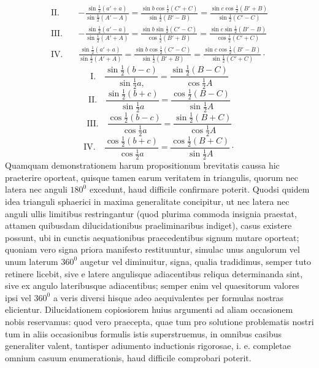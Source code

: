 {\[\begin{aligned}
\mathrm{II.}\quad&-\frac{\sin\frac{1}{2}(a'+a)}{\sin\frac{1}{2}(A'-A)}=\frac{\sin b\cos\frac{1}{2}(C'+C)}{\sin\frac{1}{2}(B'-B)}=\frac{\sin c\cos\frac{1}{2}(B'+B)}{\sin\frac{1}{2}(C'-C)}\\[.5em]
\mathrm{III.}\quad&-\frac{\sin\frac{1}{2}(a'-a)}{\sin\frac{1}{2}(A'+A)}=\frac{\sin b\sin\frac{1}{2}(C'-C)}{\cos\frac{1}{2}(B'+B)}=\frac{\sin c\sin\frac{1}{2}(B'-B)}{\cos\frac{1}{2}(C'+C)}\\[.5em]
\mathrm{IV.}\quad&\frac{\sin\frac{1}{2}(a'+a)}{\sin\frac{1}{2}(A'+A)}=\frac{\sin b\cos\frac{1}{2}(C'-C)}{\sin\frac{1}{2}(B'+B)}=\frac{\sin c\cos\frac{1}{2}(B'-B)}{\sin\frac{1}{2}(C'+C)}\cdot
\end{aligned}
\]
}
\[
\mathrm{I.}\quad\frac{\sin\frac{1}{2}(b-c)}{\sin\frac{1}{2}a{,}}=\frac{\sin\frac{1}{2}(B-C)}{\cos\frac{1}{2}A}
\]
\[
\mathrm{II.}\quad\frac{\sin\frac{1}{2}(b+c)}{\sin\frac{1}{2}a}=\frac{\cos\frac{1}{2}(B-C)}{\sin\frac{1}{2}A}
\]
\[
\mathrm{III.}\quad\frac{\cos\frac{1}{2}(b-c)}{\cos\frac{1}{2}a}=\frac{\sin\frac{1}{2}(B+C)}{\cos\frac{1}{2}A}
\]
\[
\mathrm{IV.}\quad\frac{\cos\frac{1}{2}(b+c)}{\cos\frac{1}{2}a}=\frac{\cos\frac{1}{2}(B+C)}{\sin\frac{1}{2}A}\cdot
\]
Quamquam demonstrationem harum propositionum brevitatis caussa hic praeterire oporteat, quisque tamen earum veritatem in triangulis, quorum nec latera nec anguli $180^0$ excedunt, haud difficile confirmare poterit. Quodsi quidem idea trianguli sphaerici in maxima generalitate concipitur, ut nec latera nec anguli ullis limitibus restringantur (quod plurima commoda insignia praestat, attamen quibusdam dilucidationibus praeliminaribus indiget), casus existere possunt, ubi in cunctis aequationibus praecedentibus signum mutare oporteat; quoniam vero signa priora manifesto restituuntur, simulac unus angulorum vel unum laterum $360^0$ augetur vel diminuitur, signa, qualia tradidimus, semper tuto retinere licebit, sive e latere angulisque adiacentibus reliqua determinanda sint, sive ex angulo lateribusque adiacentibus; semper enim vel quaesitorum valores ipsi vel $360^0$ a veris diversi hisque adeo aequivalentes per formulas nostras elicientur. Dilucidationem copiosiorem huius argumenti ad aliam occasionem nobis reservamus: quod vero praecepta, quae tum pro solutione problematis nostri tum in aliis occasionibus formulis istis superstruemus, in omnibus casibus generaliter valent, tantisper adiumento inductionis rigorosae, i. e. completae omnium casuum enumerationis, haud difficile comprobari poterit.
